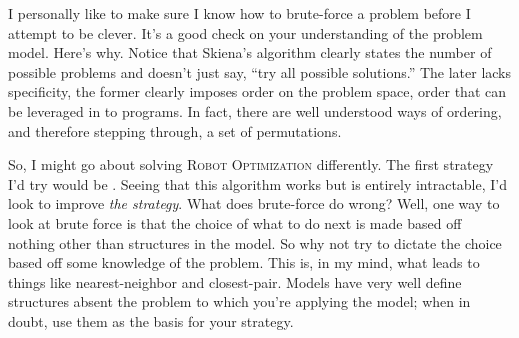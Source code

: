 \documentclass[]{tufte-handout}
\begin{document}
I personally like to make sure I know how to brute-force a problem before I attempt to be clever. It's a good check on your understanding of the problem model. Here's why.  Notice that Skiena's algorithm clearly states the number of possible problems and doesn't just say, ``try all possible solutions.''  The later lacks specificity, the former clearly imposes order on the problem space, order that can be leveraged in to programs. In fact, there are well understood ways of ordering, and therefore stepping through, a set of permutations.   

So, I might go about solving \textsc{Robot Optimization} differently. The first strategy I'd try would be .  Seeing that this algorithm works but is entirely intractable, I'd look to improve \textit{the strategy}. What does brute-force do wrong? Well, one way to look at brute force is that the choice of what to do next is made based off nothing other than structures in the model. So why not try to dictate the choice based off some knowledge of the problem. This is, in my mind, what leads to things like nearest-neighbor and closest-pair. Models have very well define structures absent the problem to which you're applying the model; when in doubt, use them as the basis for your strategy. 
\end{document}

